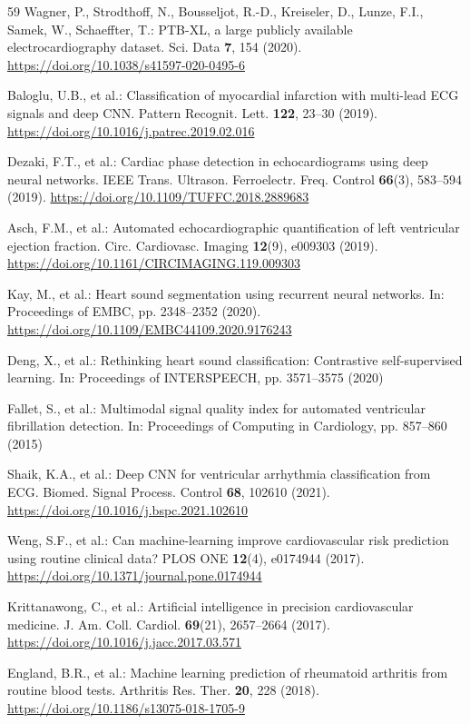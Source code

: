 \documentclass[AMA,STIX1COL,]{WileyNJD-v2}
\begin{document}
\begin{thebibliography}{59}
Wagner, P., Strodthoff, N., Bousseljot, R.-D., Kreiseler, D., Lunze, F.I., Samek, W., Schaeffter, T.: PTB-XL, a large publicly available electrocardiography dataset. Sci. Data \textbf{7}, 154 (2020). \url{https://doi.org/10.1038/s41597-020-0495-6}

Baloglu, U.B., et al.: Classification of myocardial infarction with multi-lead ECG signals and deep CNN. Pattern Recognit. Lett. \textbf{122}, 23--30 (2019). \url{https://doi.org/10.1016/j.patrec.2019.02.016}

Dezaki, F.T., et al.: Cardiac phase detection in echocardiograms using deep neural networks. IEEE Trans. Ultrason. Ferroelectr. Freq. Control \textbf{66}(3), 583--594 (2019). \url{https://doi.org/10.1109/TUFFC.2018.2889683}

Asch, F.M., et al.: Automated echocardiographic quantification of left ventricular ejection fraction. Circ. Cardiovasc. Imaging \textbf{12}(9), e009303 (2019). \url{https://doi.org/10.1161/CIRCIMAGING.119.009303}

Kay, M., et al.: Heart sound segmentation using recurrent neural networks. In: Proceedings of EMBC, pp. 2348--2352 (2020). \url{https://doi.org/10.1109/EMBC44109.2020.9176243}

Deng, X., et al.: Rethinking heart sound classification: Contrastive self-supervised learning. In: Proceedings of INTERSPEECH, pp. 3571--3575 (2020)

Fallet, S., et al.: Multimodal signal quality index for automated ventricular fibrillation detection. In: Proceedings of Computing in Cardiology, pp. 857--860 (2015)

Shaik, K.A., et al.: Deep CNN for ventricular arrhythmia classification from ECG. Biomed. Signal Process. Control \textbf{68}, 102610 (2021). \url{https://doi.org/10.1016/j.bspc.2021.102610}

Weng, S.F., et al.: Can machine-learning improve cardiovascular risk prediction using routine clinical data? PLOS ONE \textbf{12}(4), e0174944 (2017). \url{https://doi.org/10.1371/journal.pone.0174944}

Krittanawong, C., et al.: Artificial intelligence in precision cardiovascular medicine. J. Am. Coll. Cardiol. \textbf{69}(21), 2657--2664 (2017). \url{https://doi.org/10.1016/j.jacc.2017.03.571}

England, B.R., et al.: Machine learning prediction of rheumatoid arthritis from routine blood tests. Arthritis Res. Ther. \textbf{20}, 228 (2018). \url{https://doi.org/10.1186/s13075-018-1705-9}


\end{thebibliography}
\end{document}
